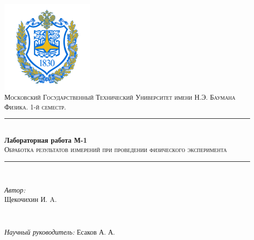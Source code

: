 \documentclass[12pt, a4paper]{article}
\begin{document}
\begin{titlepage}

\newcommand{\HRule}{\rule{\linewidth}{0.5mm}} %

\center %


\includegraphics[width=0.35\textwidth]{img/bmstu_logo.png}\\[0.5cm] %
 
\textsc{\large Московский Государственный Технический Университет имени Н.Э. Баумана}\\[0.5cm]
\textsc{\large Физика. 1-й семестр.}\\[1.5cm] %


\HRule \\[0.5cm]
{ \huge \bfseries Лабораторная работа М-1}\\
\textsc{Обработка результатов измерений при проведении физического эксперимента}
\HRule \\[2cm]
 

\begin{minipage}{0.4\textwidth}
\begin{flushleft} \large
\emph{Автор:}\\
Щекочихин И. A.
\end{flushleft}
\end{minipage}
~
\begin{minipage}{0.4\textwidth}
\begin{flushright} \large
\emph{Научный руководитель:} 
Есаков А. А.\\
\end{flushright}
\end{minipage}\\[3cm]


\end{titlepage}
\end{document}
